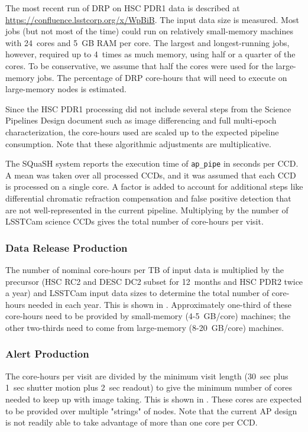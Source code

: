 The most recent run of DRP on HSC PDR1 data is described at \url{https://confluence.lsstcorp.org/x/WpBiB}.
The input data size is measured.
Most jobs (but not most of the time) could run on relatively small-memory machines with 24~cores and 5~GB RAM per core.
The largest and longest-running jobs, however, required up to 4~times as much memory, using half or a quarter of the cores.
To be conservative, we assume that half the cores were used for the large-memory jobs.
The percentage of DRP core-hours that will need to execute on large-memory nodes is estimated.

Since the HSC PDR1 processing did not include several steps from the Science Pipelines Design document  such as image differencing and full multi-epoch characterization, the core-hours used are scaled up to the expected pipeline consumption.
Note that these algorithmic adjustments are multiplicative.

The SQuaSH system reports the execution time of \texttt{ap\_pipe} in seconds per CCD.
A mean was taken over all processed CCDs, and it was assumed that each CCD is processed on a single core.
A factor is added to account for additional steps like differential chromatic refraction compensation and false positive detection that are not well-represented in the current pipeline.
Multiplying by the number of LSSTCam science CCDs gives the total number of core-hours per visit.

\subsubsection{Data Release Production}

The number of nominal core-hours per TB of input data is multiplied by the precursor (HSC RC2 and DESC DC2 subset for 12~months and HSC PDR2 twice a year) and LSSTCam input data sizes to determine the total number of core-hours needed in each year.
This is shown in .
Approximately one-third of these core-hours need to be provided by small-memory (4-5~GB/core) machines; the other two-thirds need to come from large-memory (8-20~GB/core) machines.



\subsubsection{Alert Production}

The core-hours per visit are divided by the minimum visit length (30~sec plus 1~sec shutter motion plus 2~sec readout) to give the minimum number of cores needed to keep up with image taking.
This is shown in .
These cores are expected to be provided over multiple "strings" of nodes.
Note that the current AP design is not readily able to take advantage of more than one core per CCD.

